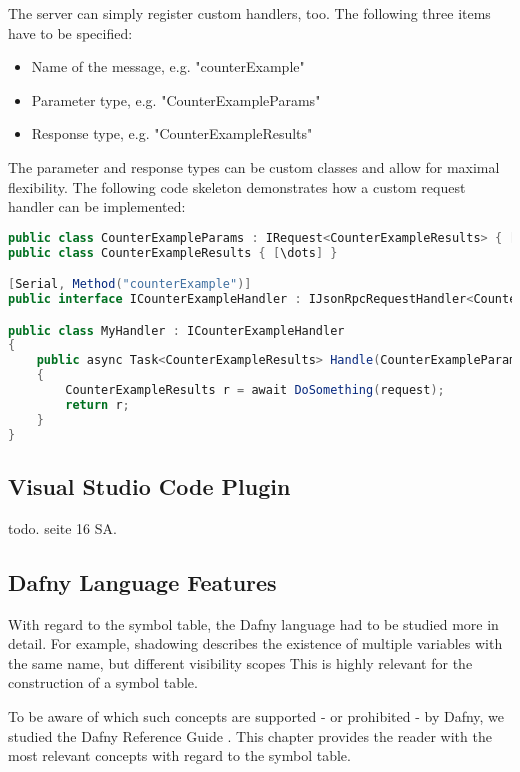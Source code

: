 The server can simply register custom handlers, too. The following three items have to be specified:
\begin{itemize}
    \item Name of the message, e.g. "counterExample"
    \item Parameter type, e.g. "CounterExampleParams"
    \item Response type, e.g. "CounterExampleResults"
\end{itemize}


The parameter and response types can be custom classes and allow for maximal flexibility.
The following code skeleton demonstrates how a custom request handler can be implemented:

\begin{lstlisting}[language=csharp, caption={LSP Handler Implementation}, captionpos=b, label={lst:lspcustomhandler}]
public class CounterExampleParams : IRequest<CounterExampleResults> { [\dots] }
public class CounterExampleResults { [\dots] }

[Serial, Method("counterExample")]
public interface ICounterExampleHandler : IJsonRpcRequestHandler<CounterExampleParams, CounterExampleResults> { }

public class MyHandler : ICounterExampleHandler
{
    public async Task<CounterExampleResults> Handle(CounterExampleParams request, CancellationToken c)
    {
        CounterExampleResults r = await DoSomething(request);
        return r;
    }
}
\end{lstlisting}


\subsection{Visual Studio Code Plugin}
todo. seite 16 SA.


\subsection{Dafny Language Features}
With regard to the symbol table, the Dafny language had to be studied more in detail.
For example, shadowing describes the existence of multiple variables with the same name, but different visibility scopes
This is highly relevant for the construction of a symbol table.

To be aware of which such concepts are supported - or prohibited - by Dafny, we studied the Dafny Reference Guide \cite{dafnyReferenceManual}.
This chapter provides the reader with the most relevant concepts with regard to the symbol table.


